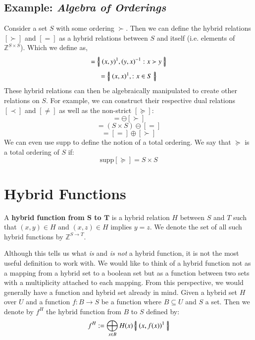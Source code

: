 \subsection{Example: \emph{Algebra of Orderings}}
Consider a set $S$ with some ordering $\succ$.
Then we can define the hybrid relations $[\succ]$ and $[=]$ as a hybrid relations between $S$ and itself 
(i.e. elements of $\mathbb{Z}^{S\times S}$).
Which we define as,
\begin{equation}
	[\succ] = \hset{ (x,y)^1, (y,x)^{-1} : x \succ y }
\end{equation}
\begin{equation}
	[=] = \hset{ (x,x)^1, : x \in S }
\end{equation}
These hybrid relations can then be algebraically manipulated to create other relations on $S$.
For example, we can construct their respective dual relations $[\prec]$ and $[\neq]$ as well as the non-strict $[\succeq]$:
\begin{equation}
	[\prec] = \ominus [\succ]
\end{equation}
\begin{equation}
	[\neq] = (S\times S) \ominus [=]
\end{equation}
\begin{equation}
	[\succeq] = [=] \oplus [\succ]
\end{equation}
We can even use supp to define the notion of a total ordering.
We say that $\succeq$ is a total ordering of $S$ if:
\begin{equation}
	\text{supp}[\succeq] = S \times S
\end{equation}


\newpage

\section{Hybrid Functions}
\begin{definition}
	A \textbf{hybrid function from $\boldsymbol{S}$ to $\boldsymbol{T}$} is 
	a hybrid relation $H$ between $S$ and $T$ such that $(x,y) \in H$ and $(x,z) \in H$ implies $y=z$.
	We denote the set of all such hybrid functions by $\mathbb{Z}^{S \to T}$.
\end{definition}


Although this tells us what \emph{is} and \emph{is not} a hybrid function, it is not the most useful definition to work with. 
We would like to think of a hybrid function not as a mapping from a hybrid set to a boolean set but as
a function between two sets with a multiplicity attached to each mapping.
From this perspective, we would generally have a function and hybrid set already in mind.
Given a hybrid set $H$ over $U$ and a function $f:B \to S$ be a function where $B \subseteq U$ and $S$ a set.
Then we denote by $f^H$ the hybrid function from $B$ to $S$ defined by:
\begin{equation}
	\label{hfunc}
	f^H := \bigoplus_{x \in B} H(x) \left\{ \! \left| \;  (x, f(x) )^1  \; \right| \! \right\}
\end{equation}



